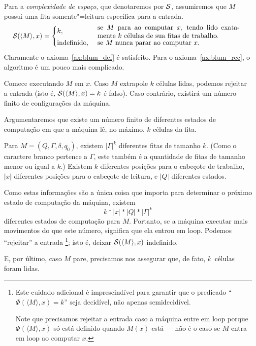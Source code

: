 \begin{example}
    \label{ex:space_complexity}
    Para a \emph{complexidade de espaço},
    que denotaremos por ${\mathcal{S}}$,
    assumiremos que $M$ possui uma fita somente"=leitura
    específica para a entrada.
    \begin{equation*}
        \PhiDS( \langle M \rangle, x) = \begin{cases}
            k, & \text{
                \parbox{0.6\textwidth}{
                    se~$M$ para ao computar~$x$,
                    tendo lido exatamente~$k$ células
                    de sua fitas de trabalho.
                }
            } \\
            \text{indefinido}, & \text{
                \parbox{0.6\textwidth}{
                    se $M$ nunca parar ao computar $x$.
                }
            }
        \end{cases}
    \end{equation*}
    Claramente o axioma~\ref{ax:blum_def} é satisfeito.
    Para o axioma~\ref{ax:blum_rec},
    o algoritmo é um pouco mais complicado.

    Comece executando $M$ em $x$.
    Caso $M$ extrapole $k$ células lidas,
    podemos rejeitar a entrada
    (isto é, ${\mathcal{S}}(\langle M \rangle, x) = k$ é falso).
    Caso contrário,
    existirá um número finito de configurações da máquina.

    Argumentaremos que existe um número finito de diferentes estados de computação
    em que a máquina lê, no máximo,
    $k$ células da fita.

    Para $M = (Q, \Gamma, \delta, q_0)$,
    existem $|\Gamma|^k$ diferentes fitas de tamanho $k$.
    (Como o caractere branco pertence a $\Gamma$,
    este também é a quantidade de fitas de tamanho menor ou igual a $k$.)
    Existem $k$ diferentes posições para o cabeçote de trabalho,
    $|x|$ diferentes posições para o cabeçote de leitura,
    e $|Q|$ diferentes estados.

    Como estas informações são a única coisa que importa
    para determinar o próximo estado de computação da máquina,
    existem
    \begin{equation*}
        k * |x| * |Q| * |\Gamma|^k
    \end{equation*}
    diferentes estados de computação para $M$.
    Portanto, se a máquina executar
    mais movimentos do que este número,
    significa que ela entrou em loop.
    Podemos ``rejeitar'' a entrada%
    \footnote{
        Este cuidado adicional é imprescindível
        para garantir que o predicado
        ``$\Phi(\langle M \rangle, x) = k$''
        seja decidível,
        não apenas semidecidível.

        Note que precisamos rejeitar a entrada
        caso a máquina entre em loop
        porque $\Phi( \langle M \rangle, x)$ só está definido
        quando $M(x)$ está
        --- não é o caso se $M$ entra em loop
        ao computar $x$.
    };
    isto é, deixar ${\mathcal{S}}(\langle M \rangle, x)$ indefinido.

    E, por último,
    caso $M$ pare,
    precisamos nos assegurar que,
    de fato,
    $k$~células foram lidas.
\end{example}

